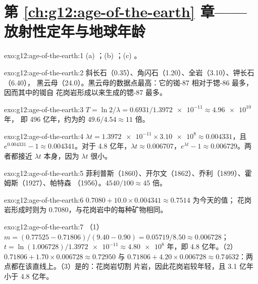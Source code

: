 \section*{第 \ref{ch:g12:age-of-the-earth} 章——放射性定年与地球年龄}

\begin{solution}{exo:g12:age-of-the-earth:1}
(a) ；(b) ；(c) 。
\end{solution}

\begin{solution}{exo:g12:age-of-the-earth:2}
斜长石（0.35）、角闪石（1.20）、全岩（3.10）、钾长石（6.40），
黑云母（24.0）。黑云母的数据点最高：它的铷-87 相对于锶-86 最多，
因而其中的铷自
花岗岩形成以来生成的锶-87 最多。
\end{solution}

\begin{solution}{exo:g12:age-of-the-earth:3}
$T = \ln 2/\lambda = 0.6931/\num{1.3972e-11} \approx \num{4.96e10}$ 年，
即 496 亿年，约为的 $49.6/4.54 \approx 11$ 倍。
\end{solution}

\begin{solution}{exo:g12:age-of-the-earth:4}
$\lambda t = \num{1.3972e-11} \times \num{3.10e8} \approx 0.004331$，且
$e^{0.004331} - 1 \approx 0.004341$。对于 4.8 亿年，$\lambda t
\approx 0.006707$，$e^{\lambda t} - 1 \approx 0.006729$。两者都接近
$\lambda t$ 本身，因为 $\lambda t$ 很小。
\end{solution}

\begin{solution}{exo:g12:age-of-the-earth:5}
菲利普斯（1860）、开尔文（1862）、乔利（1899）、霍姆斯（1927）、帕特森
（1956）。$4540/100 \approx 45$ 倍。
\end{solution}

\begin{solution}{exo:g12:age-of-the-earth:6}
$0.7080 + 10.0 \times 0.004341 \approx 0.7514$ 为今天的值；
花岗岩形成时则为 0.7080，与花岗岩中的每种矿物相同。
\end{solution}

\begin{solution}{exo:g12:age-of-the-earth:7}
（1）$m = (0.77525 - 0.71806)/(9.40 - 0.90) = 0.05719/8.50 \approx 0.006728$；
$t = \ln(1.006728)/\num{1.3972e-11} \approx \num{4.80e8}$ 年，即 4.8
亿年。（2）$0.71806 + 1.70 \times 0.006728 \approx 0.72950$ 与 $0.71806 + 4.20
\times 0.006728 \approx 0.74632$：两点都在该直线上。（3）是的：花岗岩切割
片岩，因此花岗岩较年轻，且 3.1 亿年小于 4.8 亿年。
\end{solution}

